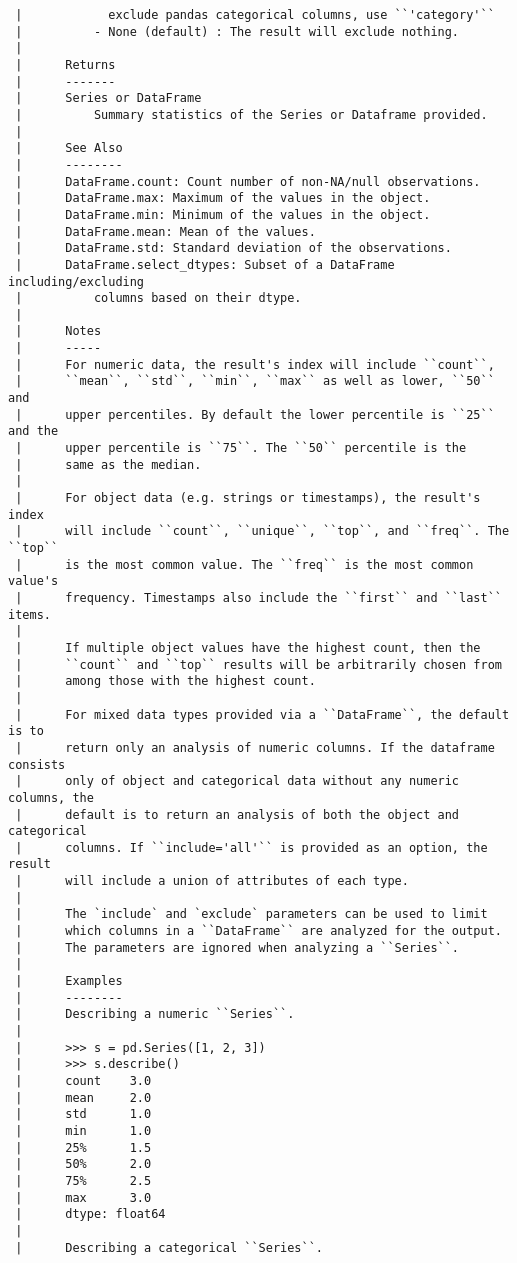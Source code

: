 \documentclass[
  letterpaper,
  DIV=11,
  numbers=noendperiod]{scrreprt}
\begin{document}
\begin{verbatim}
 |            exclude pandas categorical columns, use ``'category'``
 |          - None (default) : The result will exclude nothing.
 |      
 |      Returns
 |      -------
 |      Series or DataFrame
 |          Summary statistics of the Series or Dataframe provided.
 |      
 |      See Also
 |      --------
 |      DataFrame.count: Count number of non-NA/null observations.
 |      DataFrame.max: Maximum of the values in the object.
 |      DataFrame.min: Minimum of the values in the object.
 |      DataFrame.mean: Mean of the values.
 |      DataFrame.std: Standard deviation of the observations.
 |      DataFrame.select_dtypes: Subset of a DataFrame including/excluding
 |          columns based on their dtype.
 |      
 |      Notes
 |      -----
 |      For numeric data, the result's index will include ``count``,
 |      ``mean``, ``std``, ``min``, ``max`` as well as lower, ``50`` and
 |      upper percentiles. By default the lower percentile is ``25`` and the
 |      upper percentile is ``75``. The ``50`` percentile is the
 |      same as the median.
 |      
 |      For object data (e.g. strings or timestamps), the result's index
 |      will include ``count``, ``unique``, ``top``, and ``freq``. The ``top``
 |      is the most common value. The ``freq`` is the most common value's
 |      frequency. Timestamps also include the ``first`` and ``last`` items.
 |      
 |      If multiple object values have the highest count, then the
 |      ``count`` and ``top`` results will be arbitrarily chosen from
 |      among those with the highest count.
 |      
 |      For mixed data types provided via a ``DataFrame``, the default is to
 |      return only an analysis of numeric columns. If the dataframe consists
 |      only of object and categorical data without any numeric columns, the
 |      default is to return an analysis of both the object and categorical
 |      columns. If ``include='all'`` is provided as an option, the result
 |      will include a union of attributes of each type.
 |      
 |      The `include` and `exclude` parameters can be used to limit
 |      which columns in a ``DataFrame`` are analyzed for the output.
 |      The parameters are ignored when analyzing a ``Series``.
 |      
 |      Examples
 |      --------
 |      Describing a numeric ``Series``.
 |      
 |      >>> s = pd.Series([1, 2, 3])
 |      >>> s.describe()
 |      count    3.0
 |      mean     2.0
 |      std      1.0
 |      min      1.0
 |      25%      1.5
 |      50%      2.0
 |      75%      2.5
 |      max      3.0
 |      dtype: float64
 |      
 |      Describing a categorical ``Series``.

\end{verbatim}
\end{document}
